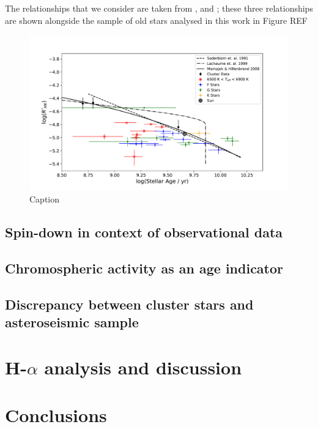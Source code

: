 The relationships that we consider are taken from \citet{Soderblom_etal_1991}, \citet{Lachaume_etal_1999} and \citet{Mamajek_Hillenbrand_2008}; these three relationships are shown alongside the sample of old stars analysed in this work in Figure REF

\begin{figure}
    \centering
    \includegraphics[scale=0.55]{Figures/4-Chromospheric_age/ca_results_3_relationship.pdf}
    \caption{Caption}
    \label{fig:comparison_previous_relationships_ca}
\end{figure}






\subsection{Spin-down in context of observational data}









\subsection{Chromospheric activity as an age indicator}









\subsection{Discrepancy between cluster stars and asteroseismic sample}








\newpage %
\section{H-$\alpha$ analysis and discussion}
\label{Chp4_halpha}








\section{Conclusions}







